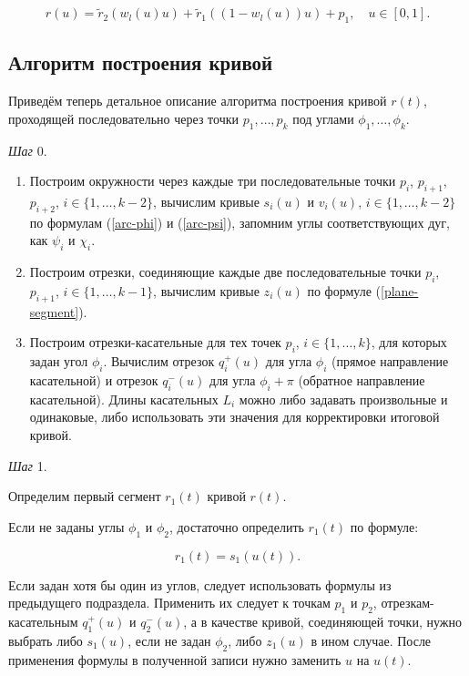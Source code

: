 \begin{equation}
r(u)=\tilde r_2(w_l(u)u)+\tilde r_1((1-w_l(u))u)+p_1, \quad u \in [0,1].
\label{plane-result-deformed-curve}
\end{equation}

\subsection*{Алгоритм построения кривой}

Приведём теперь детальное описание алгоритма построения кривой $r(t)$, проходящей последовательно через точки
$p_1,\dots,p_k$ под углами $\phi_1,\dots,\phi_k$.

\bigskip
\textit{Шаг} 0.

\begin{enumerate}
\item Построим окружности через каждые три последовательные точки $p_i$, $p_{i+1}$, $p_{i+2}$, $i \in \{1,\dots,k-2\}$,
вычислим кривые $s_i(u)$ и $v_i(u)$, $i \in \{1,\dots,k-2\}$ по формулам (\ref{arc-phi}) и (\ref{arc-psi}), запомним
углы соответствующих дуг, как $\psi_i$ и $\chi_i$.
\item Построим отрезки, соединяющие каждые две последовательные точки $p_i$, $p_{i+1}$, $i \in \{1,\dots,k-1\}$,
вычислим кривые $z_i(u)$ по формуле (\ref{plane-segment}).
\item Построим отрезки-касательные для тех точек $p_i$, $i \in \{1,\dots,k\}$, для которых задан угол $\phi_i$.
Вычислим отрезок $q_i^+(u)$ для угла $\phi_i$ (прямое направление касательной) и отрезок $q_i^-(u)$ для угла
$\phi_i+\pi$ (обратное направление касательной). Длины касательных $L_i$ можно либо задавать произвольные и одинаковые,
либо использовать эти значения для корректировки итоговой кривой.
\end{enumerate}

\bigskip
\textit{Шаг} 1.

Определим первый сегмент $r_1(t)$ кривой $r(t)$.

Если не заданы углы $\phi_1$ и $\phi_2$, достаточно определить $r_1(t)$ по формуле:

$$
r_1(t)=s_1(u(t)).
$$

Если задан хотя бы один из углов, следует использовать формулы из предыдущего подраздела. Применить их следует к
точкам $p_1$ и $p_2$, отрезкам-касательным $q_1^+(u)$ и $q_2^-(u)$, а в качестве кривой, соединяющей точки, нужно
выбрать либо $s_1(u)$, если не задан $\phi_2$, либо $z_1(u)$ в ином случае. После применения формулы в полученной
записи нужно заменить $u$ на $u(t)$.

